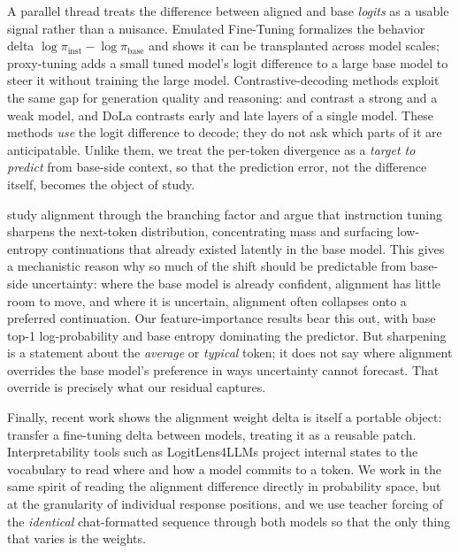  A parallel thread treats the
difference between aligned and base \emph{logits} as a usable signal rather than
a nuisance. Emulated Fine-Tuning \citep{mitchell2023eft} formalizes the behavior
delta $\log \pi_{\text{inst}} - \log \pi_{\text{base}}$ and shows it can be
transplanted across model scales; proxy-tuning \citep{liu2024proxy} adds a small
tuned model's logit difference to a large base model to steer it without training
the large model. Contrastive-decoding methods exploit the same gap for
generation quality and reasoning: \citet{li2023contrastivedecoding} and
\citet{obrien2023contrastive} contrast a strong and a weak model, and DoLa
\citep{chuang2023dola} contrasts early and late layers of a single model. These
methods \emph{use} the logit difference to decode; they do not ask which parts of
it are anticipatable. Unlike them, we treat the per-token divergence as a
\emph{target to predict} from base-side context, so that the prediction error,
not the difference itself, becomes the object of study.

 \citet{yang2026branching}
study alignment through the branching factor and argue that instruction tuning
sharpens the next-token distribution, concentrating mass and surfacing
low-entropy continuations that already existed latently in the base model. This
gives a mechanistic reason why so much of the shift should be predictable from
base-side uncertainty: where the base model is already confident, alignment has
little room to move, and where it is uncertain, alignment often collapses onto a
preferred continuation. Our feature-importance results bear this out, with base
top-1 log-probability and base entropy dominating the predictor. But sharpening
is a statement about the \emph{average} or \emph{typical} token; it does not say
where alignment overrides the base model's preference in ways uncertainty cannot
forecast. That override is precisely what our residual captures.

 Finally, recent work
shows the alignment weight delta is itself a portable object: \citet{shadowft2025}
transfer a fine-tuning delta between models, treating it as a reusable patch.
Interpretability tools such as LogitLens4LLMs \citep{logitlens2025} project
internal states to the vocabulary to read where and how a model commits to a
token. We work in the same spirit of reading the alignment difference directly in
probability space, but at the granularity of individual response positions, and
we use teacher forcing of the \emph{identical} chat-formatted sequence through
both models so that the only thing that varies is the weights.

